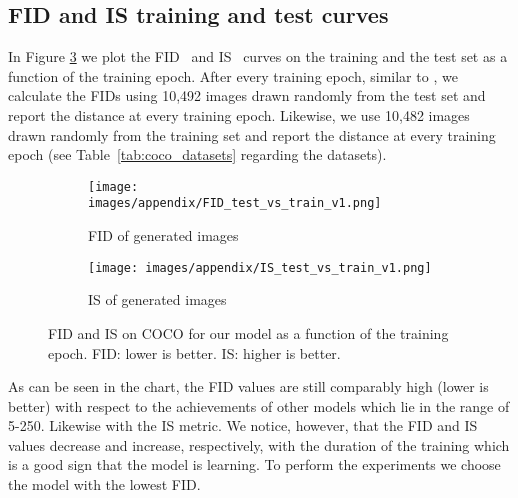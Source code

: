 \documentclass[a4paper,12pt]{report}
\begin{document}
\subsection{FID and IS training and test curves}\label{sec:train_vs_test_FID}
In Figure \ref{fig:fid_is_metrics} we plot the FID~\cite{TTUR} and IS~\cite{ImprTechn4TrainGANs} curves on the training and the test set as a function of the training epoch. After every training epoch, similar to \cite{StyleGAN}, we calculate the FIDs using 10,492 images drawn randomly from the test set and report the distance at every training epoch. Likewise, we use 10,482 images drawn randomly from the training set and report the distance at every training epoch (see Table~\ref{tab:coco_datasets} regarding the datasets). 
\begin{figure}[ht!]
\centering
\begin{subfigure}{0.49\textwidth}
\texttt{[image: images/appendix/FID\_test\_vs\_train\_v1.png]}
\caption{FID of generated images}
\label{fig:fid_test_train}
\end{subfigure}
\begin{subfigure}{0.49\textwidth}
\texttt{[image: images/appendix/IS\_test\_vs\_train\_v1.png]}
\caption{IS of generated images}
\label{fig:is_test_train}
\end{subfigure}
\caption[FID and IS on COCO for our model.]{FID and IS on COCO for our model as a function of the training epoch. FID: lower is better. IS: higher is better.}
\label{fig:fid_is_metrics}
\end{figure}
As can be seen in the chart, the FID values are still comparably high (lower is better) with respect to the achievements of other models which lie in the range of 5-250. Likewise with the IS metric. We notice, however, that the FID and IS values decrease and increase, respectively, with the duration of the training which is a good sign that the model is learning. To perform the experiments we choose the model with the lowest FID.



\end{document}
